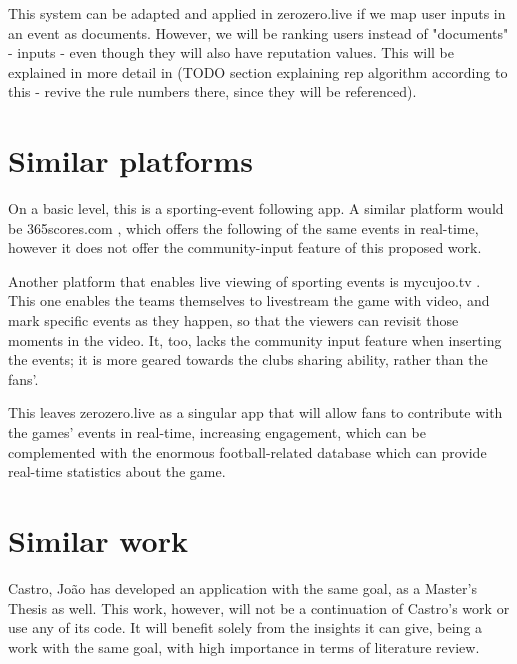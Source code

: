 \begin{enumerate}
    This system can be adapted and applied in zerozero.live if we map user inputs in an event as documents. However, we will be ranking users instead of "documents" - inputs - even though they will also have reputation values. This will be explained in more detail in (TODO section explaining rep algorithm according to this - revive the rule numbers there, since they will be referenced).
    
\end{enumerate} 

\section{Similar platforms}

On a basic level, this is a sporting-event following app. A similar platform would be 365scores.com \cite{365scores-about}, which offers the following of the same events in real-time, however it does not offer the community-input feature of this proposed work.

Another platform that enables live viewing of sporting events is mycujoo.tv \cite{mycujoo-about}. This one enables the teams themselves to livestream the game with video, and mark specific events as they happen, so that the viewers can revisit those moments in the video. It, too, lacks the community input feature when inserting the events; it is more geared towards the clubs sharing ability, rather than the fans'. 

This leaves zerozero.live as a singular app that will allow fans to contribute with the games' events in real-time, increasing engagement, which can be complemented with the enormous football-related database which can provide real-time statistics about the game.

\section{Similar work}

Castro, João \cite{PedroSousaCastro2020} has developed an application with the same goal, as a Master's Thesis as well. This work, however, will not be a continuation of Castro's work or use any of its code. It will benefit solely from the insights it can give, being a work with the same goal, with high importance in terms of literature review.

